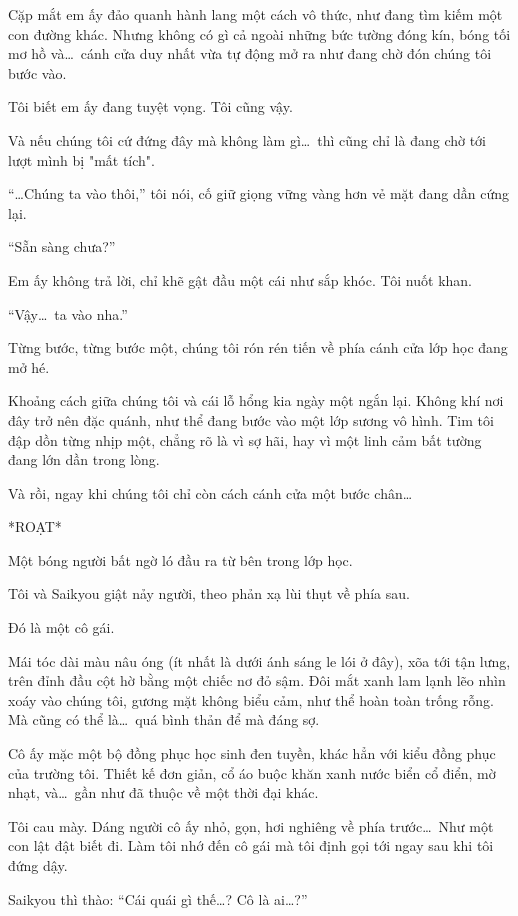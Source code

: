 \documentclass[../main.tex]{subfiles}
\begin{document}
Cặp mắt em ấy đảo quanh hành lang một cách vô thức, như đang tìm kiếm một con đường khác. Nhưng không có gì cả ngoài những bức tường đóng kín, bóng tối mơ hồ và\dots\ cánh cửa duy nhất vừa tự động mở ra như đang chờ đón chúng tôi bước vào.

Tôi biết em ấy đang tuyệt vọng. Tôi cũng vậy.

Và nếu chúng tôi cứ đứng đây mà không làm gì\dots\ thì cũng chỉ là đang chờ tới lượt mình bị "mất tích".

``\dots Chúng ta vào thôi,'' tôi nói, cố giữ giọng vững vàng hơn vẻ mặt đang dần cứng lại.

``Sẵn sàng chưa?''

Em ấy không trả lời, chỉ khẽ gật đầu một cái như sắp khóc. Tôi nuốt khan.

``Vậy\dots\ ta vào nha.''

Từng bước, từng bước một, chúng tôi rón rén tiến về phía cánh cửa lớp học đang mở hé.

Khoảng cách giữa chúng tôi và cái lỗ hổng kia ngày một ngắn lại. Không khí nơi đây trở nên đặc quánh, như thể đang bước vào một lớp sương vô hình. Tim tôi đập dồn từng nhịp một, chẳng rõ là vì sợ hãi, hay vì một linh cảm bất tường đang lớn dần trong lòng.

Và rồi, ngay khi chúng tôi chỉ còn cách cánh cửa một bước chân\dots

*ROẠT*

Một bóng người bất ngờ ló đầu ra từ bên trong lớp học.

Tôi và Saikyou giật nảy người, theo phản xạ lùi thụt về phía sau.

Đó là một cô gái.


Mái tóc dài màu nâu óng (ít nhất là dưới ánh sáng le lói ở đây), xõa tới tận lưng, trên đỉnh đầu cột hờ bằng một chiếc nơ đỏ sậm. Đôi mắt xanh lam lạnh lẽo nhìn xoáy vào chúng tôi, gương mặt không biểu cảm, như thể hoàn toàn trống rỗng. Mà cũng có thể là\dots\ quá bình thản để mà đáng sợ.

Cô ấy mặc một bộ đồng phục học sinh đen tuyền, khác hẳn với kiểu đồng phục của trường tôi. Thiết kế đơn giản, cổ áo buộc khăn xanh nước biển cổ điển, mờ nhạt, và\dots\ gần như đã thuộc về một thời đại khác.

Tôi cau mày. Dáng người cô ấy nhỏ, gọn, hơi nghiêng về phía trước\dots\ Như một con lật đật biết đi. Làm tôi nhớ đến cô gái mà tôi định gọi tới ngay sau khi tôi đứng dậy.

Saikyou thì thào: ``Cái quái gì thế\dots? Cô là ai\dots?''
\end{document}
